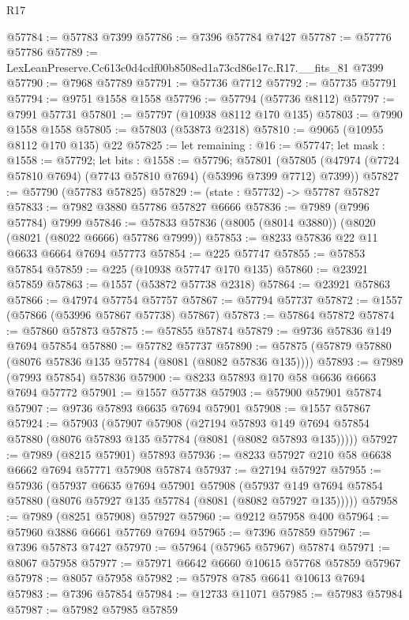 \begin{lexlean}{R17}
\begin{coremodule}
@57784 := @57783 @7399
@57786 := @7396 @57784 @7427
@57787 := @57776 @57786
@57789 := LexLeanPreserve.Cc613c0d4cdf00b8508ed1a73cd86e17c.R17.__fits_81 @7399
@57790 := @7968 @57789
@57791 := @57736 @7712
@57792 := @57735 @57791
@57794 := @9751 @1558 @1558
@57796 := @57794 (@57736 @8112)
@57797 := @7991 @57731
@57801 := @57797 (@10938 @8112 @170 @135)
@57803 := @7990 @1558 @1558
@57805 := @57803 (@53873 @2318)
@57810 := @9065 (@10955 @8112 @170 @135) @22
@57825 := let remaining : @16 := @57747;
  let mask : @1558 := @57792;
  let bits : @1558 := @57796;
  @57801 (@57805 (@47974 (@7724 @57810 @7694) (@7743 @57810 @7694) (@53996 @7399 @7712) @7399))
@57827 := @57790 (@57783 @57825)
@57829 := (state : @57732) -> @57787 @57827
@57833 := @7982 @3880 @57786 @57827 @6666
@57836 := @7989 (@7996 @57784) @7999
@57846 := @57833 @57836 (@8005 (@8014 @3880)) (@8020 (@8021 (@8022 @6666) @57786 @7999))
@57853 := @8233 @57836 @22 @11 @6633 @6664 @7694 @57773
@57854 := @225 @57747
@57855 := @57853 @57854
@57859 := @225 (@10938 @57747 @170 @135)
@57860 := @23921 @57859
@57863 := @1557 (@53872 @57738 @2318)
@57864 := @23921 @57863
@57866 := @47974 @57754 @57757
@57867 := @57794 @57737
@57872 := @1557 (@57866 (@53996 @57867 @57738) @57867)
@57873 := @57864 @57872
@57874 := @57860 @57873
@57875 := @57855 @57874
@57879 := @9736 @57836 @149 @7694 @57854
@57880 := @57782 @57737
@57890 := @57875 (@57879 @57880 (@8076 @57836 @135 @57784 (@8081 (@8082 @57836 @135))))
@57893 := @7989 (@7993 @57854) @57836
@57900 := @8233 @57893 @170 @58 @6636 @6663 @7694 @57772
@57901 := @1557 @57738
@57903 := @57900 @57901 @57874
@57907 := @9736 @57893 @6635 @7694 @57901
@57908 := @1557 @57867
@57924 := @57903
    (@57907
      @57908
      (@27194
        @57893
        @149
        @7694
        @57854
        @57880
        (@8076 @57893 @135 @57784 (@8081 (@8082 @57893 @135)))))
@57927 := @7989 (@8215 @57901) @57893
@57936 := @8233 @57927 @210 @58 @6638 @6662 @7694 @57771 @57908 @57874
@57937 := @27194 @57927
@57955 := @57936
    (@57937
      @6635
      @7694
      @57901
      @57908
      (@57937 @149 @7694 @57854 @57880 (@8076 @57927 @135 @57784 (@8081 (@8082 @57927 @135)))))
@57958 := @7989 (@8251 @57908) @57927
@57960 := @9212 @57958 @400
@57964 := @57960 @3886 @6661 @57769 @7694
@57965 := @7396 @57859
@57967 := @7396 @57873 @7427
@57970 := @57964 (@57965 @57967) @57874
@57971 := @8067 @57958
@57977 := @57971 @6642 @6660 @10615 @57768 @57859 @57967
@57978 := @8057 @57958
@57982 := @57978 @785 @6641 @10613 @7694
@57983 := @7396 @57854
@57984 := @12733 @11071
@57985 := @57983 @57984
@57987 := @57982 @57985 @57859

\end{coremodule}
\end{lexlean}

